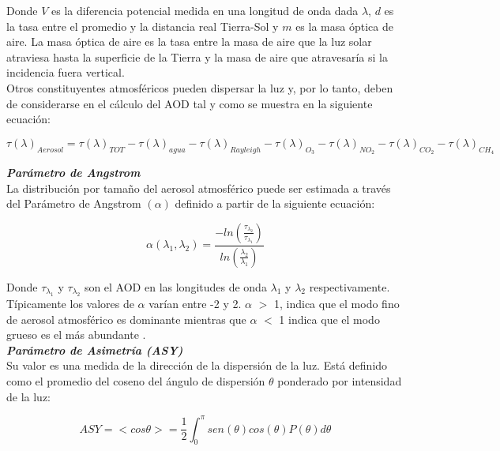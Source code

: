 Donde $V$ es la diferencia potencial medida en una longitud de onda dada $\lambda$, $d$ es la tasa entre el promedio y la distancia real Tierra-Sol y $m$ es la masa óptica de aire. La masa óptica de aire es la tasa entre la masa de aire que la luz solar atraviesa hasta la superficie de la Tierra y la masa de aire que atravesaría si la incidencia fuera vertical.\\

Otros constituyentes atmosféricos pueden dispersar la luz y, por lo tanto, deben de considerarse en el cálculo del AOD \citep{Holben1998} tal y como se muestra en la siguiente ecuación:

\begin{equation}
\tau (\lambda)_{Aerosol} = \tau (\lambda)_{TOT} - \tau (\lambda)_{agua} - \tau (\lambda)_{Rayleigh} - \tau (\lambda)_{O_3} - \tau (\lambda)_{NO_2} - \tau (\lambda)_{CO_2} - \tau (\lambda)_{CH_4}
\end{equation}

\newpage

\textit{\textbf{Parámetro de Angstrom}}\\

La distribución por tamaño del aerosol atmosférico puede ser estimada a través del Parámetro de Angstrom $(\alpha)$ \citep{Holben1998} definido a partir de la siguiente ecuación:

\begin{equation}
\alpha (\lambda_1, \lambda_2) = \frac { -ln (\frac{\tau_\lambda_2}{\tau_\lambda_1})}{ ln(\frac{\lambda_2}{\lambda_1})}
\end{equation}

Donde $\tau_\lambda_1$ y $\tau_\lambda_2$ son el AOD en las longitudes de onda $\lambda_1$ y $\lambda_2$ respectivamente. Típicamente los valores de $\alpha$ varían entre -2 y 2.  $\alpha$ $>$ 1, indica que el modo fino de aerosol atmosférico es dominante mientras que  $\alpha$ $<$ 1 indica que el modo grueso es el más abundante \citep{Carabali2017}.\\

\textit{\textbf{Parámetro de Asimetría (ASY)}}\\

Su valor es una medida de la dirección de la dispersión de la luz. Está definido como el promedio del coseno del ángulo de dispersión $\theta$ ponderado por intensidad de la luz:

\begin{equation}
ASY = < cos \theta > = \frac{1}{2} \int_{0}^{\pi} sen (\theta) cos(\theta) P(\theta) d\theta
\end{equation}

